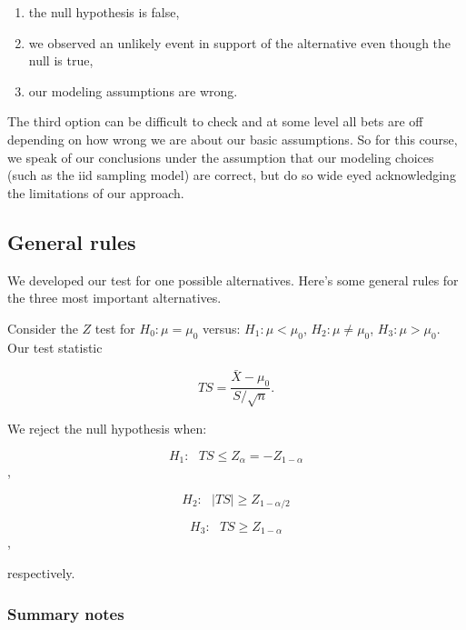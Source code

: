 \documentclass[]{article}
\begin{document}
\begin{enumerate}
\def\labelenumi{\arabic{enumi}.}
\itemsep1pt\parskip0pt
\item
  the null hypothesis is false,
\item
  we observed an unlikely event in support of the alternative even
  though the null is true,
\item
  our modeling assumptions are wrong.
\end{enumerate}

The third option can be difficult to check and at some level all bets
are off depending on how wrong we are about our basic assumptions. So
for this course, we speak of our conclusions under the assumption that
our modeling choices (such as the iid sampling model) are correct, but
do so wide eyed acknowledging the limitations of our approach.

\subsection{General rules}\label{general-rules}

We developed our test for one possible alternatives. Here's some general
rules for the three most important alternatives.

Consider the $Z$ test for $H_0:\mu = \mu_0$ versus: $H_1: \mu < \mu_0$,
$H_2: \mu \neq \mu_0$, $H_3: \mu > \mu_0$. Our test statistic

\[TS = \frac{\bar{X} - \mu_0}{S / \sqrt{n}}.\]

We reject the null hypothesis when:

\[H_1 : ~~~ TS \leq Z_{\alpha} = -Z_{1 - \alpha}\],

\[H_2 : ~~~ |TS| \geq Z_{1 - \alpha / 2}\]

\[H_3 : ~~~ TS \geq Z_{1 - \alpha}\],

respectively.

\subsubsection{Summary notes}\label{summary-notes-7}
\end{document}
